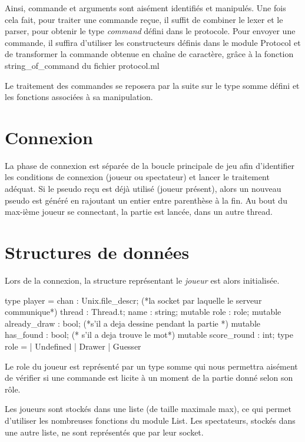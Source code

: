\documentclass[a4paper, 11pt]{report}
\begin{document}
Ainsi, commande et arguments sont aisément identifiés et manipulés. 
Une fois cela fait, pour traiter une commande reçue, il suffit
de combiner le lexer et le parser, pour
obtenir le type \emph{command} défini dans le protocole. Pour
envoyer une commande, il suffira d'utiliser les constructeurs définis
dans le module Protocol et de transformer la commande obtenue en chaîne de
caractère, grâce à la fonction string\_of\_command du fichier protocol.ml  

Le traitement des commandes se reposera par la suite sur le type somme
défini et les fonctions associées à sa manipulation.

\section{Connexion}

La phase de connexion est séparée de la boucle principale de jeu afin
d'identifier les conditions de connexion (joueur ou spectateur) et
lancer le traitement adéquat. Si le pseudo reçu est déjà utilisé
(joueur présent), alors un nouveau pseudo est généré en rajoutant un
entier entre parenthèse à la fin. Au bout du max-ième joueur se
connectant, la partie est lancée, dans un autre thread.

\section{Structures de données}

Lors de la connexion, la structure représentant le \emph{joueur} est
alors initialisée.

\begin{OCaml}
type player = {
  chan : Unix.file_descr; (*la socket par laquelle le serveur communique*)
  thread : Thread.t;
  name : string;
  mutable role : role; 
  mutable already_draw : bool; (*s'il a deja dessine pendant la partie *)
  mutable has_found : bool; (* s'il a deja trouve le mot*)
  mutable score_round : int; 
}
type role =
  | Undefined
  | Drawer
  | Guesser 

\end{OCaml}

Le role du joueur est représenté par un type somme qui nous permettra
aisément de vérifier si une commande est licite à un moment de la partie
donné selon son rôle.

Les joueurs sont stockés dans une liste (de taille maximale max),
ce qui permet d'utiliser les nombreuses fonctions du module List. 
Les spectateurs, stockés dans une autre liste, ne sont représentés que par leur socket.
\end{document}
